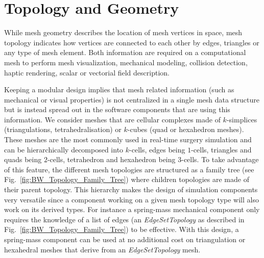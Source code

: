 \section{Topology and Geometry}

While mesh geometry describes the location of mesh vertices in space, mesh topology indicates 
how vertices are connected to each other by edges, triangles or any type of mesh element. 
Both information are required on a computational mesh to perform mesh visualization,
mechanical modeling, collision detection, haptic rendering, scalar
or vectorial field description.



Keeping a modular design implies that mesh related information (such as mechanical or visual properties) is not centralized in a single  mesh data structure but is instead spread out in the software components that are using this information.
We consider meshes that are cellular complexes made of $k$-simplices (triangulations, tetrahedralisation) or $k$-cubes (quad or hexahedron meshes). These meshes are the most commonly used in real-time surgery simulation and can be hierarchically decomposed into $k$-cells, edges being $1$-cells, triangles and quads being $2$-cells, tetrahedron and hexahedron being $3$-cells. 
To take advantage of this feature, the  different mesh topologies are structured as a family tree (see Fig.~\ref{fig:BW_Topology_Family_Tree}) where children topologies are made of their parent topology. This hierarchy makes the design of simulation components very versatile since a component working on a given mesh topology type will also work on its derived types. For instance a spring-mass mechanical component only requires the knowledge of a list of edges (an \textit{EdgeSetTopology} as described in Fig.~\ref{fig:BW_Topology_Family_Tree}) to be effective. With this design, a spring-mass  component can be used at no additional cost on triangulation or hexahedral meshes that derive from an \textit{EdgeSetTopology} mesh.
 
